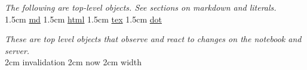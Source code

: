 \textit{The following are top-level objects. See sections on markdown and literals.}\\
\api%
{1.5cm}{
\href{https://github.com/observablehq/stdlib\#md}{md}
}%
{1.5cm}{
\href{https://github.com/observablehq/stdlib\#html}{html}
}%
{1.5cm}{
\href{https://github.com/observablehq/stdlib\#tex}{tex}
}
{1.5cm}{
\href{https://github.com/observablehq/stdlib\#dot}{dot}
}\stopapi


\textit{These are top level objects that observe and react to changes on the notebook and server.}\\
\api%
{2cm}{
invalidation
}%
{2cm}{
now
}%
{2cm}{
width
}\stopapi

